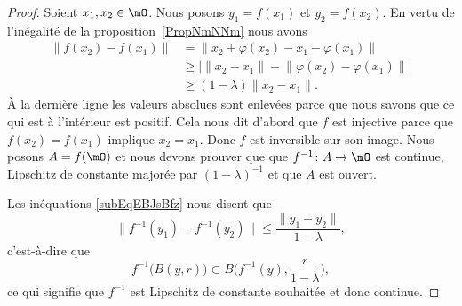 \begin{proof}
	Soient \( x_1,x_2\in\mO\). Nous posons \( y_1=f(x_1)\) et \( y_2=f(x_2)\). En vertu de l'inégalité de la proposition~\ref{PropNmNNm} nous avons
	\begin{subequations}      \label{subEqEBJsBfz}
		\begin{align}
			\big\| f(x_2)-f(x_1) \big\| & =   \big\| x_2+\varphi(x_2)-x_1-\varphi(x_1) \big\|                     \\
			                            & \geq  \Big| \| x_2-x_1 \|-\big\| \varphi(x_2)-\varphi(x_1) \big\| \Big| \\
			                            & \geq  (1-\lambda)\| x_2-x_1 \|.
		\end{align}
	\end{subequations}
	À la dernière ligne les valeurs absolues sont enlevées parce que nous savons que ce qui est à l'intérieur est positif. Cela nous dit d'abord que \( f\) est injective parce que \( f(x_2)=f(x_1)\) implique \( x_2=x_1\). Donc \( f\) est inversible sur son image. Nous posons \( A=f(\mO)\) et nous devons prouver que que \( f^{-1}\colon A\to \mO\) est continue, Lipschitz de constante majorée par \( (1-\lambda)^{-1}\) et que \( A\) est ouvert.

	Les inéquations \eqref{subEqEBJsBfz} nous disent que
	\begin{equation}
		\big\| f^{-1}(y_1)-f^{-1}(y_2) \big\|\leq \frac{ \| y_1-y_2 \| }{ 1-\lambda },
	\end{equation}
	c'est-à-dire que
	\begin{equation}
		f^{-1}\big( B(y,r) \big)\subset B\big( f^{-1}(y),\frac{ r }{ 1-\lambda } \big),
	\end{equation}
	ce qui signifie que \( f^{-1}\) est Lipschitz de constante souhaitée et donc continue.


\end{proof}
